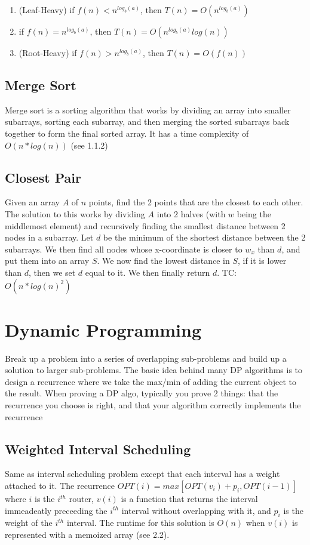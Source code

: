 \documentclass{article}
\begin{document}
\begin{enumerate}
    \item (Leaf-Heavy) if $f(n) < n^{log_b(a)}$, then  $T(n) = O(n^{log_b(a)})$
    \item if $f(n) = n^{log_b(a)}$, then $T(n) = O(n^{log_b(a)}log(n))$
    \item (Root-Heavy) if $f(n) > n^{log_b(a)}$, then $T(n) = O(f(n))$
\end{enumerate}

\subsection{Merge Sort}
Merge sort is a sorting algorithm that works by dividing an array into smaller subarrays, sorting each subarray, and then merging the sorted subarrays back together to form the final sorted array. It has a time complexity of $O(n*log(n))$ (see 1.1.2)

\subsection{Closest Pair}
Given an array $A$ of $n$ points, find the 2 points that are the closest to each other. 
The solution to this works by dividing $A$ into 2 halves (with $w$ being the middlemost element) and recursively finding the smallest
distance between 2 nodes in a subarray. Let $d$ be the minimum of the shortest distance between
the 2 subarrays. We then find all nodes whose x-coordinate is closer to $w_x$ than $d$, and
put them into an array $S$. We now find the lowest distance in $S$, if it is lower than $d$, 
then we set $d$ equal to it. We then finally return $d$. TC: $O(n*log(n)^2)$

\section{Dynamic Programming}
Break up a problem into a series of overlapping sub-problems and build up a solution to larger sub-problems.
The basic idea behind many DP algorithms is to design a recurrence where we take the max/min of adding the current
object to the result. When proving a DP algo, typically you prove 2 things: that the recurrence you choose is right, and 
that your algorithm correctly implements the recurrence

\subsection{Weighted Interval Scheduling}
Same as interval scheduling problem except that each interval has a weight attached to it. 
The recurrence $OPT(i) = max[OPT(v_i) + p_i, OPT(i - 1)]$ where $i$ is the $i^{th}$ router, $v(i)$
is a function that returns the interval immeadeatly preceeding the $i^{th}$ interval without overlapping with it, 
and $p_i$ is the weight of the $i^{th}$ interval. The runtime for this solution is $O(n)$ when $v(i)$ is 
represented with a memoized array (see 2.2).
\end{document}
